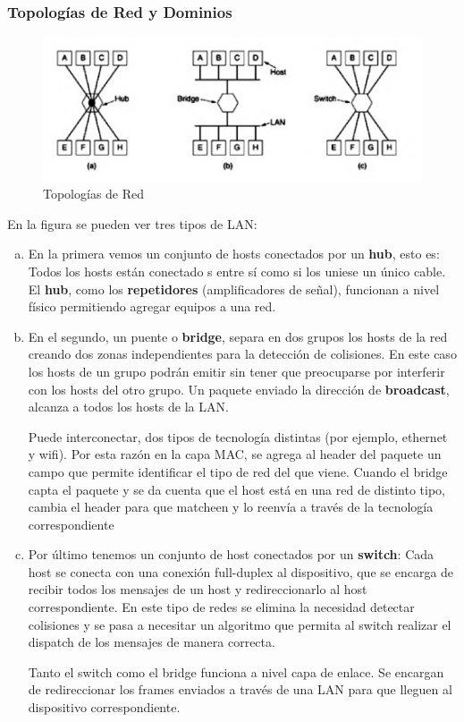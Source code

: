 \subsubsection{Topologías de Red y Dominios}
\begin{figure}[H]
	\centering
	\includegraphics[width=\textwidth
]{images/topologias-red.png}
	\caption[Topologías de Red]{Topologías de Red}
	\label{fig:topologias-red}
\end{figure}
En la figura \label{fig:topologias-red} se pueden ver tres tipos de LAN:
\begin{enumerate}[a)]
  \item En la primera vemos un conjunto de hosts conectados por un \textbf{hub}, esto es: Todos los hosts están conectado
  s entre sí como si los uniese un único cable. El \textbf{hub}, como los \textbf{repetidores} (amplificadores de señal), funcionan a nivel físico permitiendo agregar equipos a una red.
  \item En el segundo, un puente o \textbf{bridge}, separa en dos grupos los hosts de la red creando dos zonas independientes para la detección de colisiones. En este caso los hosts de un grupo podrán emitir sin tener que preocuparse por interferir con los hosts del otro grupo. Un paquete enviado la dirección de \textbf{broadcast}, alcanza a todos los hosts de la LAN.
  
  Puede interconectar, dos tipos de tecnología distintas (por ejemplo, ethernet y wifi). Por esta razón en la capa MAC, se agrega al header del paquete un campo que permite identificar el tipo de red del que viene. Cuando el bridge capta el paquete y se da cuenta que el host está en una red de distinto tipo, cambia el header para que matcheen y lo reenvía a través de la tecnología correspondiente
  \item Por último tenemos un conjunto de host conectados por un \textbf{switch}: Cada host se conecta con una conexión full-duplex al dispositivo, que se encarga de recibir todos los mensajes de un host y redireccionarlo al host correspondiente. En este tipo de redes se elimina la necesidad detectar colisiones y se pasa a necesitar un algoritmo que permita al switch realizar el dispatch de los mensajes de manera correcta.
  
  Tanto el switch como el bridge funciona a nivel capa de enlace. Se encargan de redireccionar los frames enviados a través de una LAN para que lleguen al dispositivo correspondiente.
\end{enumerate}

